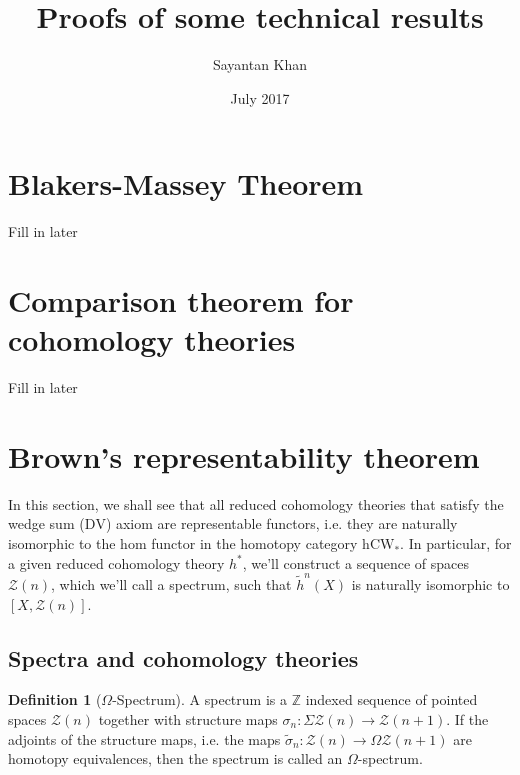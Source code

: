 \documentclass[12pt, notitlepage]{article}
\title{Proofs of some technical results}
\author{Sayantan Khan}
\date{July 2017}
\theoremstyle{definition}
\newtheorem{defn}{Definition}[section]
\newcommand{\cat}[1]{\mathrm{#1}}
\newcommand{\cohomtheorie}{{h}^{\ast}}
\newcommand{\calz}{\mathcal{Z}}
\newcommand{\redco}{\widetilde{h}}
\newcommand{\dv}{\mathrm{DV}}
\begin{document}
\maketitle

\tableofcontents


\newpage

\section{Blakers-Massey Theorem}
\label{sec:blak-mass-theor}

Fill in later

\section{Comparison theorem for cohomology theories}
\label{sec:comp-theor-cohom}

Fill in later

\section{Brown's representability theorem}
\label{sec:browns-repr-theor}

In this section, we shall see that all reduced cohomology theories that satisfy the wedge sum
($\dv$) axiom are representable functors, i.e. they are naturally isomorphic to the hom functor in
the homotopy category $\cat{hCW}_{\ast}$. In particular, for a given reduced cohomology theory
$\cohomtheorie$, we'll construct a sequence of spaces $\calz(n)$, which we'll call a spectrum, such
that $\redco^n(X)$ is naturally isomorphic to $\left[X, \calz(n)\right]$.

\subsection{Spectra and cohomology theories}
\label{sec:spectra-cohom-theor}

\begin{defn}[$\Omega$-Spectrum]
  A spectrum is a $\mathbb{Z}$ indexed sequence of pointed spaces $\calz(n)$ together with structure
  maps $\sigma_n: \Sigma \calz(n) \to \calz(n+1)$. If the adjoints of the structure maps, i.e. the
  maps $\widetilde{\sigma}_n: \calz(n) \to \Omega \calz(n+1)$ are homotopy equivalences, then the
  spectrum is called an $\Omega$-spectrum.
\end{defn}
\end{document}
